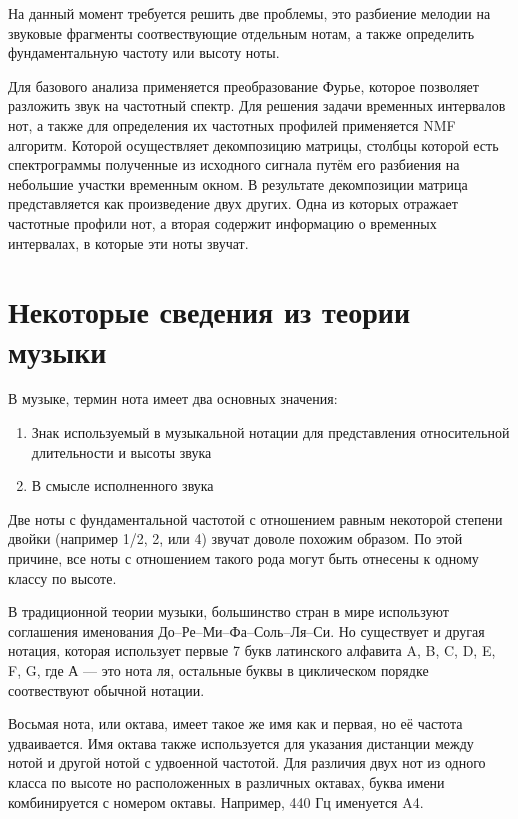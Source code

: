 \documentclass[oneside, final, 14pt]{extarticle}
\begin{document}
  На данный момент требуется решить две проблемы, это разбиение мелодии на
  звуковые фрагменты соотвествующие отдельным нотам, а также определить
  фундаментальную частоту или высоту ноты.

  Для базового анализа применяется преобразование Фурье, которое позволяет
  разложить звук на частотный спектр. Для решения задачи временных
  интервалов нот, а также для определения их частотных профилей
  применяется NMF алгоритм. Которой осуществляет декомпозицию
  матрицы, столбцы которой есть спектрограммы полученные из исходного
  сигнала путём его разбиения на небольшие участки временным окном.
  В результате декомпозиции матрица представляется как произведение
  двух других. Одна из которых отражает частотные профили нот, а вторая
  содержит информацию о временных интервалах, в которые эти ноты звучат.
\cleardoublepage

\section{Некоторые сведения из теории музыки}

  В музыке, термин нота имеет два основных значения:

  \begin{enumerate}
    \item Знак используемый в музыкальной нотации для представления
      относительной длительности и высоты звука
    \item В смысле исполненного звука
  \end{enumerate}

  Две ноты с фундаментальной частотой с отношением равным некоторой
  степени двойки (например 1/2, 2, или 4) звучат доволе похожим
  образом. По этой причине, все ноты с отношением такого рода могут
  быть отнесены к одному классу по высоте.

  В традиционной теории музыки, большинство стран в мире используют
  соглашения именования До--Ре--Ми--Фа--Соль--Ля--Си. Но существует
  и другая нотация, которая использует первые 7 букв латинского
  алфавита A, B, C, D, E, F, G, где А --- это нота ля, остальные
  буквы в циклическом порядке соотвествуют обычной нотации.

  Восьмая нота, или октава, имеет такое же имя как и первая, но её частота
  удваивается. Имя октава также используется для указания дистанции между
  нотой и другой нотой с удвоенной частотой. Для различия двух нот из одного
  класса по высоте но расположенных в различных октавах, буква имени
  комбинируется с номером октавы. Например, 440 Гц именуется A4.
\end{document}
